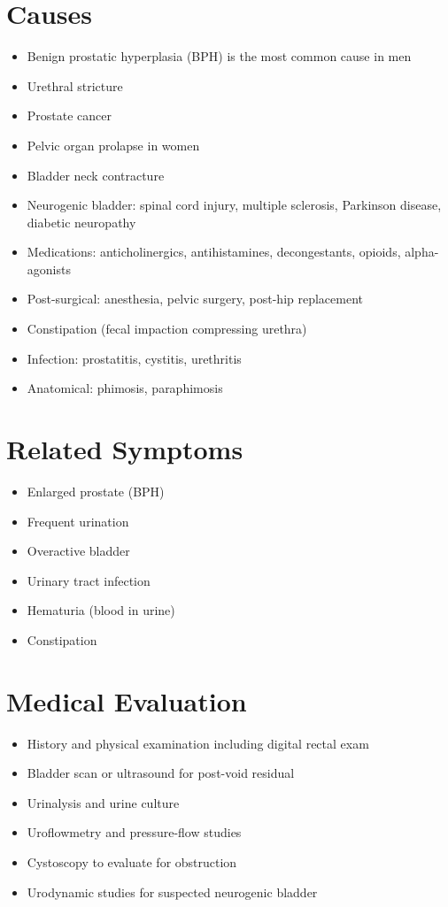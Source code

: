 \section*{Causes}
\begin{itemize}
\item Benign prostatic hyperplasia (BPH) is the most common cause in men
\item Urethral stricture
\item Prostate cancer
\item Pelvic organ prolapse in women
\item Bladder neck contracture
\item Neurogenic bladder: spinal cord injury, multiple sclerosis, Parkinson disease, diabetic neuropathy
\item Medications: anticholinergics, antihistamines, decongestants, opioids, alpha-agonists
\item Post-surgical: anesthesia, pelvic surgery, post-hip replacement
\item Constipation (fecal impaction compressing urethra)
\item Infection: prostatitis, cystitis, urethritis
\item Anatomical: phimosis, paraphimosis
\end{itemize}

\section*{Related Symptoms}
\begin{itemize}
\item Enlarged prostate (BPH)
\item Frequent urination
\item Overactive bladder
\item Urinary tract infection
\item Hematuria (blood in urine)
\item Constipation
\end{itemize}

\section*{Medical Evaluation}
\begin{itemize}
\item History and physical examination including digital rectal exam
\item Bladder scan or ultrasound for post-void residual
\item Urinalysis and urine culture
\item Uroflowmetry and pressure-flow studies
\item Cystoscopy to evaluate for obstruction
\item Urodynamic studies for suspected neurogenic bladder
\end{itemize}

